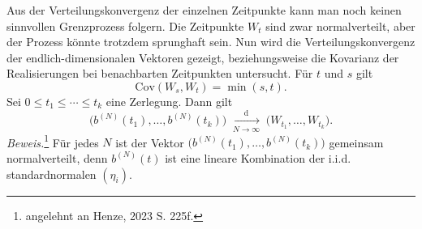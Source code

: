 \begin{satz}
Aus der Verteilungskonvergenz der einzelnen Zeitpunkte kann man noch keinen sinnvollen Grenzprozess folgern.
Die Zeitpunkte $W_t$ sind zwar normalverteilt, aber der Prozess könnte trotzdem sprunghaft sein.
Nun wird die Verteilungskonvergenz der endlich-dimensionalen Vektoren gezeigt, beziehungsweise
die Kovarianz der Realisierungen bei benachbarten Zeitpunkten untersucht. Für $t$ und $s$ gilt 
$$
\mathrm{Cov}(W_s, W_t) = \min(s,t).
$$
Sei $0\le t_1\le\cdots\le t_k$ eine Zerlegung. Dann gilt
$$
\big(b^{(N)}(t_1), \dots , b^{(N)}(t_k) \big )\;\xrightarrow[N \to \infty]{\mathrm{d}}\;\big(W_{t_1},\dots,W_{t_k}\big).
$$
\textit{Beweis.}\footnote{angelehnt an Henze, 2023 \cite{henze} S. 225f.}
Für jedes $N$ ist der Vektor $\big(b^{(N)}(t_1),\dots,b^{(N)}(t_k)\big)$ gemeinsam normalverteilt,
denn $b^{(N)}(t)$ ist eine lineare Kombination der i.i.d. standardnormalen $(\eta_i)$.


\end{satz}
